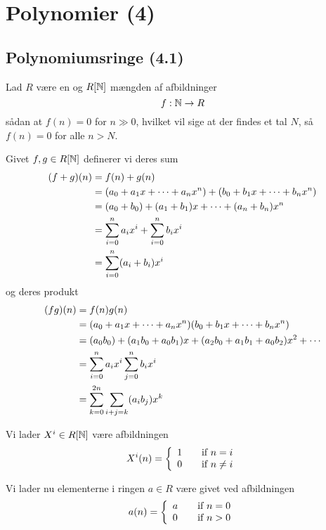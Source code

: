 \section{Polynomier (4)}
\subsection{Polynomiumsringe (4.1)}
\label{Polynomiumsringe (4.1)}
Lad $R$ være en  og $R[\mathbb{N}]$ mængden af afbildninger
\begin{equation*}
  f: \mathbb{N} \rightarrow R
\end{equation*}
sådan at $f(n) = 0$ for $n \gg 0$, hvilket vil sige at der findes et tal $N$, så
$f(n)=0$ for alle $n>N$.

Givet $f,g \in R[\mathbb{N}]$ definerer vi deres sum 
\begin{align*}
  (f + g)(n) &= f(n) + g(n)\\
             &= (a_0 + a_1 x + \cdots + a_n x^n) + (b_0 + b_1 x + \cdots + b_n x^n)\\
             &= (a_0 + b_0) + (a_1 + b_1)x + \cdots + (a_n + b_n)x^n\\
             &= \sum_{i=0}^{n}a_i x^i + \sum_{i=0}^{n}b_i x^i\\ 
             &= \sum_{i=0}^{n}(a_i + b_i) x^i
\end{align*}
og deres produkt
\begin{align*}
  (fg)(n) &= f(n)g(n)\\
             &= (a_0 + a_1 x + \cdots + a_n x^n)(b_0 + b_1 x + \cdots + b_n x^n)\\
             &= (a_0 b_0) + (a_1 b_0 + a_0 b_1)x + (a_2 b_0 + a_1 b_1 + a_0
             b_2)x^2 + \cdots\\
             &= \sum_{i=0}^{n}a_i x^i \sum_{j=0}^{n}b_i x^i\\
             &= \sum_{k=0}^{2n} \sum_{i+j = k}(a_i b_j)x^k
\end{align*}

Vi lader $X^i \in R[\mathbb{N}]$ være afbildningen
\begin{equation*}
  X^i(n) =  
  \left\{ 
  \begin{array}{l l}
    1 & \quad \text{if $n = i$}\\
    0 & \quad \text{if $n \neq i$}\\
  \end{array} \right.
\end{equation*}

Vi lader nu elementerne i ringen $a \in R$ være givet ved afbildningen
\begin{equation*}
    a(n) =  
  \left\{ 
  \begin{array}{l l}
    a & \quad \text{if $n = 0$}\\
    0 & \quad \text{if $n > 0$}\\
  \end{array} \right.
\end{equation*}

